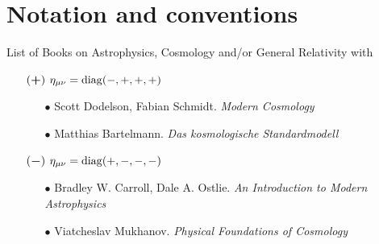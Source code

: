 \chapter*{Notation and conventions}
\thispagestyle{empty}

List of Books on Astrophysics, Cosmology and/or General Relativity with

\begin{itemize}
    \item[$(\boldsymbol{+})$] $\eta_{\mu \nu} = \operatorname{diag}(-,+,+,+)$
    \begin{itemize}
        \item[$\bullet$] Scott Dodelson, Fabian Schmidt. \textit{Modern Cosmology} \cite{Dodelson2020}
        \item[$\bullet$] Matthias Bartelmann. \textit{Das kosmologische Standardmodell} \cite{Bartelmann2019}
    \end{itemize}
    \item[$(\boldsymbol{-})$] $\eta_{\mu \nu} = \operatorname{diag}(+,-,-,-)$
    \begin{itemize}
        \item[$\bullet$] Bradley W. Carroll, Dale A. Ostlie. \textit{An Introduction to Modern Astrophysics} \cite{BradleyCarroll2007}
        \item[$\bullet$] Viatcheslav Mukhanov. \textit{Physical Foundations of Cosmology}
    \end{itemize}
\end{itemize}





